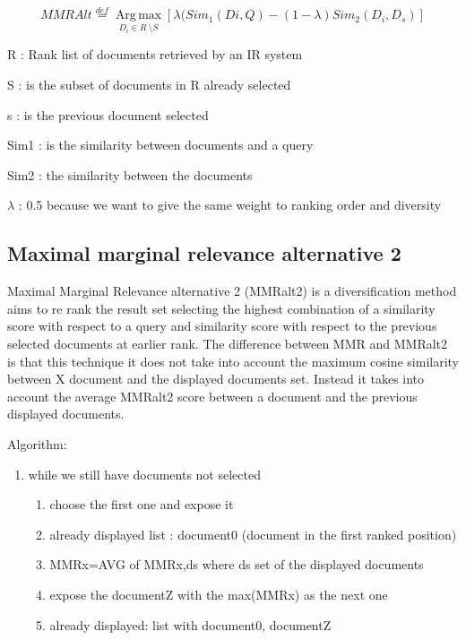 \begin{equation}
MMRAlt\overset{def}{=}\operatorname*{Arg \, \max}_{D_{i}\in R\ \setminus S}[\lambda(Sim_{1}(Di,Q)-(1-\lambda) Sim_{2}(D_{i},D_{s})]
\end{equation}

R : Rank list of documents retrieved by an IR system

S : is the subset of documents in R already selected

s : is the previous document selected

Sim1 : is the similarity between documents and a query

Sim2 : the similarity between the documents

$\lambda$ : 0.5 because we want to give the same weight to ranking order and diversity



\subsection{Maximal marginal relevance alternative 2}

Maximal Marginal Relevance alternative 2 (MMRalt2) is a diversification method aims to re rank the result set selecting the highest combination of a similarity score with respect to a query and similarity score with respect to the previous selected documents at earlier rank. The difference between MMR and MMRalt2 is that this technique it does not take into account the maximum cosine similarity between X document and the displayed documents set. Instead it takes into account the average MMRalt2 score between a document and the previous displayed documents.

Algorithm:

\begin{enumerate}
\item while we still have documents not selected
	\begin{enumerate}
	\item choose the first one and expose it
	\item already displayed list : document0 (document in the first ranked position)
	\item MMRx=AVG of MMRx,ds where ds set of the displayed documents
	\item expose the documentZ with the max(MMRx) as the next one
	\item already displayed: list with document0, documentZ
	\end{enumerate}
\end{enumerate}

